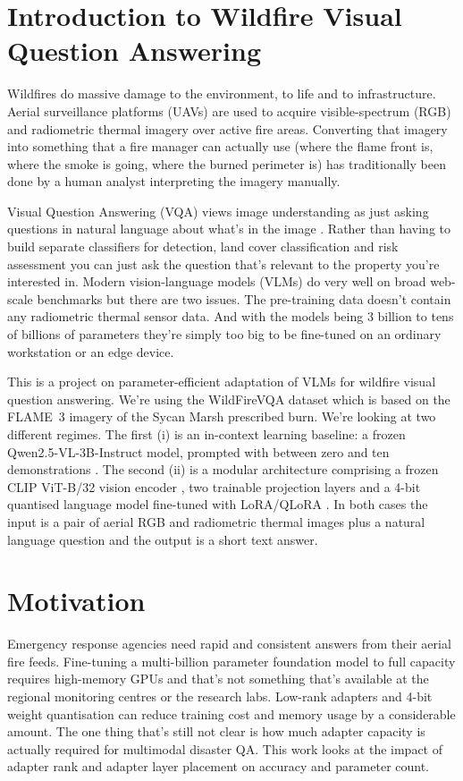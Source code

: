 \documentclass[12pt]{report}
\begin{document}
\section{Introduction to Wildfire Visual Question Answering}
Wildfires do massive damage to the environment, to life and to infrastructure. Aerial surveillance platforms (UAVs) are used to acquire visible-spectrum (RGB) and radiometric thermal imagery over active fire areas. Converting that imagery into something that a fire manager can actually use (where the flame front is, where the smoke is going, where the burned perimeter is) has traditionally been done by a human analyst interpreting the imagery manually.

Visual Question Answering (VQA) views image understanding as just asking questions in natural language about what's in the image \cite{antol2015}. Rather than having to build separate classifiers for detection, land cover classification and risk assessment you can just ask the question that's relevant to the property you're interested in. Modern vision-language models (VLMs) do very well on broad web-scale benchmarks \cite{bai2023,bai2025} but there are two issues. The pre-training data doesn't contain any radiometric thermal sensor data. And with the models being 3 billion to tens of billions of parameters they're simply too big to be fine-tuned on an ordinary workstation or an edge device.

This is a project on parameter-efficient adaptation of VLMs for wildfire visual question answering. We're using the WildFireVQA dataset \cite{wildfirevqa,flame3} which is based on the FLAME~3 imagery of the Sycan Marsh prescribed burn. We're looking at two different regimes. The first (i) is an in-context learning baseline: a frozen Qwen2.5-VL-3B-Instruct model, prompted with between zero and ten demonstrations \cite{brown2020,bai2025}. The second (ii) is a modular architecture comprising a frozen CLIP ViT-B/32 vision encoder \cite{radford2021}, two trainable projection layers and a 4-bit quantised language model fine-tuned with LoRA/QLoRA \cite{dettmers2023,hu2022}. In both cases the input is a pair of aerial RGB and radiometric thermal images plus a natural language question and the output is a short text answer.

\section{Motivation}
Emergency response agencies need rapid and consistent answers from their aerial fire feeds. Fine-tuning a multi-billion parameter foundation model to full capacity requires high-memory GPUs and that's not something that's available at the regional monitoring centres or the research labs. Low-rank adapters and 4-bit weight quantisation can reduce training cost and memory usage by a considerable amount. The one thing that's still not clear is how much adapter capacity is actually required for multimodal disaster QA. This work looks at the impact of adapter rank and adapter layer placement on accuracy and parameter count.
\end{document}

